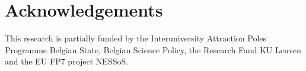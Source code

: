 \section*{Acknowledgements}
%
%
%
%
%
%
%
%
%



\newpage

\null
\vfill
This research is partially funded by the Interuniversity
Attraction Poles Programme Belgian State, Belgian Science Policy, the Research
Fund KU Leuven and the EU FP7 project NESSoS.



